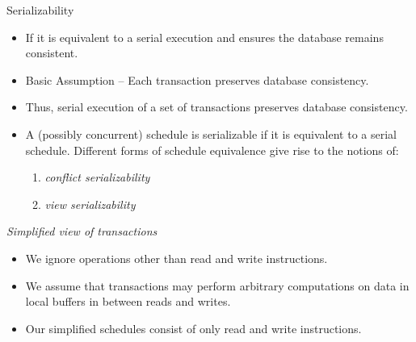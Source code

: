 \documentclass{beamer}
\begin{document}
\begin{frame}{Serializability}

    \begin{itemize}
        \item If it is equivalent to a serial execution and ensures the database remains consistent.
        \item Basic Assumption – Each transaction preserves database consistency.
        \item Thus, serial execution of a set of transactions preserves database consistency.
        \item A (possibly concurrent) schedule is serializable if it is equivalent to a serial schedule. Different forms of schedule equivalence give rise to the notions of:
            \begin{enumerate}
                \item \textit{conflict serializability}
                \item \textit{view serializability}
            \end{enumerate}
    \end{itemize}

\end{frame}

\begin{frame}{\textit{Simplified view of transactions}}
    \begin{itemize}
        \item We ignore operations other than read and write instructions.
        \item We assume that transactions may perform arbitrary computations on data in local buffers in between reads and writes.
        \item Our simplified schedules consist of only read and write instructions.
    \end{itemize}
\end{frame}
\end{document}
